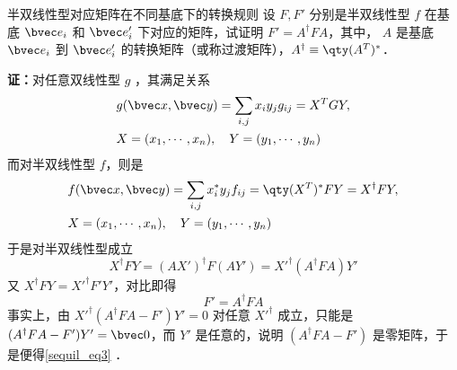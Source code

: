 \begin{example}{半双线性型对应矩阵在不同基底下的转换规则}\label{sequil_ex1}
设 $F,F'$ 分别是半双线性型 $f$ 在基底 $\bvec e_i$ 和 $\bvec e'_i$ 下对应的矩阵，试证明 $F'=A^\dagger FA$，其中， $A$ 是基底 $\bvec e_i$ 到 $\bvec e'_i$ 的转换矩阵（或称过渡矩阵），$A^\dagger\equiv\qty(A^{T})^*$．

\textbf{证：}对任意双线性型 $g$ ，其满足关系
\begin{equation}
\begin{aligned}
&g(\bvec x,\bvec y)=\sum_{i,j}x_i y_j g_{ij}=X^TGY,\\
&X=(x_1,\cdots,x_n),\quad Y=(y_1,\cdots,y_n)
\end{aligned}
\end{equation}
而对半双线性型 $f$，则是
\begin{equation}
\begin{aligned}
&f(\bvec x,\bvec y)=\sum_{i,j}x_i^* y_j f_{ij}=\qty(X^T)^*FY=X^\dagger FY,\\
&X=(x_1,\cdots,x_n),\quad Y=(y_1,\cdots,y_n)
\end{aligned}
\end{equation}
于是对半双线性型成立
\begin{equation}
X^\dagger FY=(AX')^\dagger F(AY')={X'}^\dagger(A^\dagger FA)Y'
\end{equation}
又 $X^\dagger F Y=X'^\dagger F'Y'$，对比即得
\begin{equation}\label{sequil_eq3}
F'=A^\dagger F A
\end{equation}
事实上，由 ${X'}^\dagger(A^\dagger FA-F')Y'=0$ 对任意 $X'^\dagger$ 成立，只能是 $(A^\dagger FA-F')Y'=\bvec 0$，而 $Y'$ 是任意的，说明 $(A^\dagger FA-F')$ 是零矩阵，于是便得\autoref{sequil_eq3} ．
\end{example}